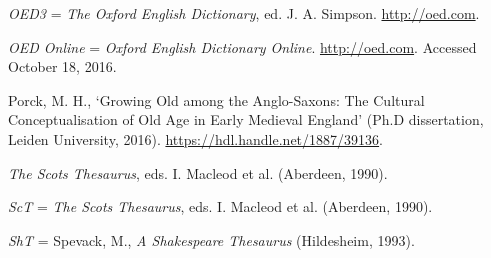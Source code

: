 \begin{list}{}

\item 
\textit{OED3} = 
\textit{The Oxford English Dictionary}, ed. J. A. Simpson. \url{http://oed.com}.

\item %
\textit{OED Online}	= \textit{Oxford English Dictionary Online}. \url{http://oed.com}. Accessed October 18, 2016.


\item %
Porck, M. H., `Growing Old among the Anglo-Saxons: The Cultural Conceptualisation of Old Age in Early Medieval England' (Ph.D dissertation, Leiden University, 2016). \url{https://hdl.handle.net/1887/39136}.





\item %
\textit{The Scots Thesaurus}, eds. I. Macleod et al. (Aberdeen, 1990).

\item %
\textit{ScT} = \textit{The Scots Thesaurus}, eds. I. Macleod et al. (Aberdeen, 1990).


\item %
\textit{ShT} = Spevack, M., \textit{A Shakespeare Thesaurus} (Hildesheim, 1993).


\end{list}
